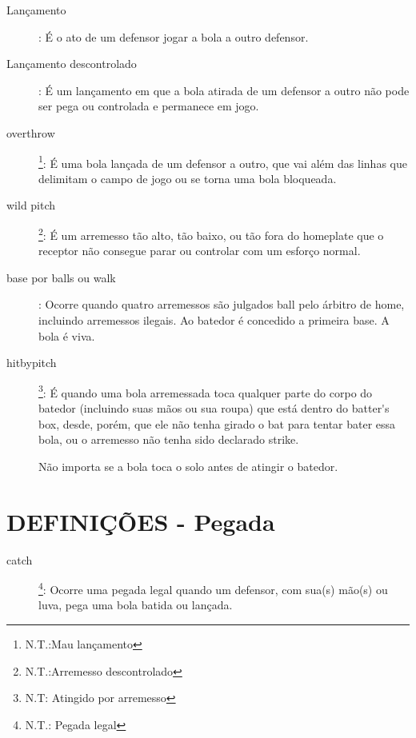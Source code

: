 	\begin{description}	
	\item[Lan\c{c}amento]: \'E o ato de um defensor jogar a bola a outro defensor.

	\item[Lan\c{c}amento descontrolado]: \'E um lan\c{c}amento em que a bola atirada de um defensor a outro n\~ao pode ser pega ou controlada e permanece em jogo. 

	\item[\Gls{overthrow}]\footnote{N.T.:Mau lan\c{c}amento}: \'E uma bola lan\c{c}ada de um defensor a outro, que vai al\'em das linhas que delimitam o campo de jogo ou se torna uma bola bloqueada. 

	\item[\gls{wild pitch}]\footnote{N.T.:Arremesso descontrolado}: \'E um arremesso t\~ao alto, t\~ao baixo, ou t\~ao fora do \gls{homeplate} que o receptor n\~ao consegue parar ou controlar com um esfor\c{c}o normal. 
	
	\item[base por \glspl{ball} ou \gls{walk} ]: Ocorre quando quatro arremessos s\~ao julgados \gls{ball} pelo \'arbitro de \gls{home}, incluindo arremessos ilegais. Ao batedor \'e concedido a primeira base. A bola \'e viva. 


	\item[\Gls{hitbypitch}]\footnote{N.T: Atingido por arremesso}:	\'E quando uma bola arremessada toca qualquer parte do corpo do batedor (incluindo suas m\~aos ou sua roupa) que est\'a dentro do \gls{batter's box}, desde, por\'em, que ele n\~ao tenha girado o \gls{bat} para tentar bater essa bola, ou o arremesso n\~ao tenha sido declarado \gls{strike}. 
	
	N\~ao importa se a bola toca o solo antes de atingir o batedor. 
	\end{description}

\section{DEFINI\c{C}\~OES - Pegada}

	\begin{description}		
		\item[\Gls{catch}]\footnote{N.T.: Pegada legal}: Ocorre uma pegada legal quando um defensor, com sua(s) m\~ao(s) ou luva, pega uma bola batida ou lan\c{c}ada. 
	\end{description}
	
